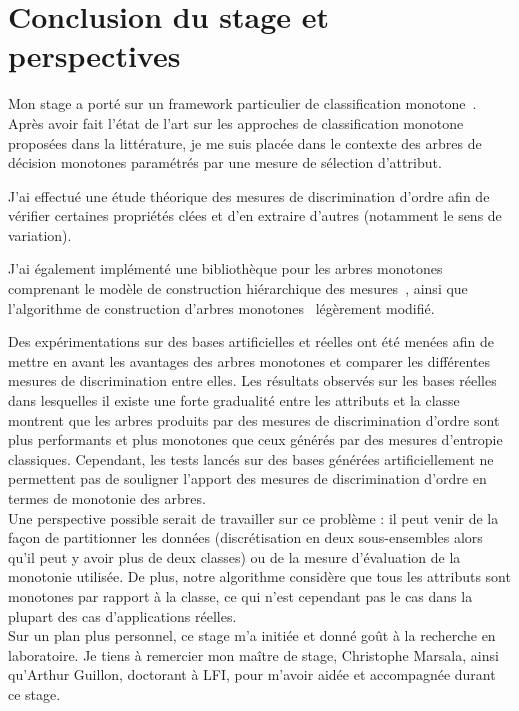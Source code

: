 \documentclass[a4paper]{article}
\begin{document}
\section{Conclusion du stage et perspectives} 

Mon stage a porté sur un framework particulier de classification
monotone~\cite{marsala-rank}. Après avoir fait l'état de l'art sur les approches
de classification monotone proposées dans la littérature, je me suis placée dans
le contexte des arbres de décision monotones paramétrés par une mesure de
sélection d'attribut.

J'ai effectué une étude théorique des mesures de discrimination d'ordre afin de
vérifier certaines propriétés clées et d'en extraire d'autres (notamment le sens
de variation). 

J'ai également implémenté
une bibliothèque pour les arbres monotones comprenant le modèle de construction
hiérarchique des mesures~\cite{marsala-rank}, ainsi que l'algorithme de
construction d'arbres monotones~\cite{marsala-rank} légèrement modifié. 

Des expérimentations sur des bases artificielles et réelles ont été menées afin de
mettre en avant les avantages des arbres monotones et comparer les différentes
mesures de discrimination entre elles. Les résultats observés sur les bases
réelles dans lesquelles il existe une forte gradualité entre les attributs et la
classe montrent que les arbres produits par des mesures de discrimination
d'ordre sont plus performants et plus monotones que ceux générés par des mesures
d'entropie classiques. Cependant, les tests lancés sur des bases générées
artificiellement ne permettent pas de souligner l'apport des mesures de
discrimination d'ordre en termes de monotonie des
arbres. \\

Une perspective possible serait de travailler sur ce problème : il peut venir de la façon de partitionner les données (discrétisation en deux sous-ensembles
alors qu'il peut y avoir plus de deux classes) ou de la mesure d'évaluation de la
monotonie utilisée. De plus, notre algorithme considère que tous les attributs
sont monotones par rapport à la classe, ce qui n'est cependant pas le cas dans
la plupart des cas d'applications réelles. \\

Sur un plan plus personnel, ce stage m'a initiée et donné goût à la recherche en
laboratoire. Je tiens à remercier mon maître de stage, Christophe Marsala, ainsi
qu'Arthur Guillon, doctorant à LFI, pour m'avoir aidée et accompagnée durant ce
stage.

\printbibliography 
\end{document}
